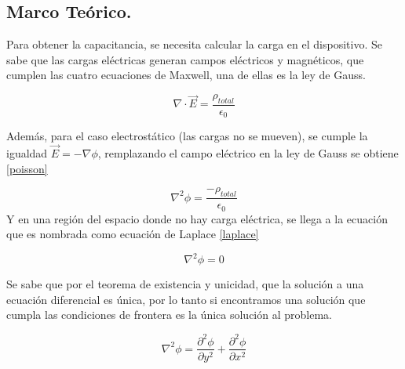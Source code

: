 \subsection{Marco Teórico.}


Para obtener la capacitancia, se necesita calcular la carga en el dispositivo. Se sabe que las cargas eléctricas generan campos eléctricos y magnéticos, que cumplen las cuatro ecuaciones de Maxwell, una de ellas es la ley de Gauss.


\begin{equation}
    \nabla \cdot \Vec{E} =\frac{\rho_{total}}{\epsilon_0}
\end{equation}

Además, para el caso electrostático (las cargas no se mueven), se cumple la igualdad  $\Vec{E}=-\nabla\phi$, remplazando el campo eléctrico en la ley de Gauss se obtiene \ref{poisson} 


\begin{equation}
     \label{poisson}
    \nabla^2 \phi =\frac{-\rho_{total}}{\epsilon_0}
\end{equation}
Y en una región del espacio donde no hay carga eléctrica, se llega a la ecuación  que es nombrada como ecuación de Laplace \ref{laplace}

\begin{equation}
\label{laplace}
    \nabla^2 \phi =0
\end{equation}

Se sabe que por el teorema de existencia y unicidad, que la solución a una ecuación diferencial es única, por lo tanto si encontramos una solución que cumpla las condiciones de frontera es la única solución al problema. 

\begin{equation}
\label{partials}
\nabla^2 \phi = \frac{\partial^2 \phi}{\partial y^2} + \frac{\partial^2 \phi}{\partial x^2} 
\end{equation}


